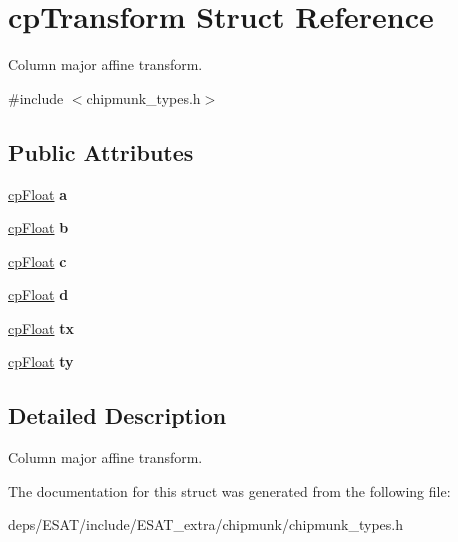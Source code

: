 \hypertarget{structcp_transform}{}\section{cp\+Transform Struct Reference}
\label{structcp_transform}


Column major affine transform.  




{\ttfamily \#include $<$chipmunk\+\_\+types.\+h$>$}

\subsection*{Public Attributes}
\begin{DoxyCompactItemize}
\item 
\mbox{\label{structcp_transform_a99065fbbead0a1df742987d5236f9fa0}} 
\mbox{\hyperlink{group__basic_types_gac1ed65573e035bf892505768c852d8d3}{cp\+Float}} {\bfseries a}
\item 
\mbox{\label{structcp_transform_a86126f0cf307529a7faab06f7356a698}} 
\mbox{\hyperlink{group__basic_types_gac1ed65573e035bf892505768c852d8d3}{cp\+Float}} {\bfseries b}
\item 
\mbox{\label{structcp_transform_ab0da955529cd2c48fe0aca3d4ff239a7}} 
\mbox{\hyperlink{group__basic_types_gac1ed65573e035bf892505768c852d8d3}{cp\+Float}} {\bfseries c}
\item 
\mbox{\label{structcp_transform_a9ad9383b2b2d39d419cb9434f3d761b2}} 
\mbox{\hyperlink{group__basic_types_gac1ed65573e035bf892505768c852d8d3}{cp\+Float}} {\bfseries d}
\item 
\mbox{\label{structcp_transform_ab96aaff15cc6eee33ebc02a9008e364d}} 
\mbox{\hyperlink{group__basic_types_gac1ed65573e035bf892505768c852d8d3}{cp\+Float}} {\bfseries tx}
\item 
\mbox{\label{structcp_transform_a19248d1cb0123595538815db45ce81b1}} 
\mbox{\hyperlink{group__basic_types_gac1ed65573e035bf892505768c852d8d3}{cp\+Float}} {\bfseries ty}
\end{DoxyCompactItemize}


\subsection{Detailed Description}
Column major affine transform. 

The documentation for this struct was generated from the following file\+:\begin{DoxyCompactItemize}
\item 
deps/\+E\+S\+A\+T/include/\+E\+S\+A\+T\+\_\+extra/chipmunk/chipmunk\+\_\+types.\+h\end{DoxyCompactItemize}

